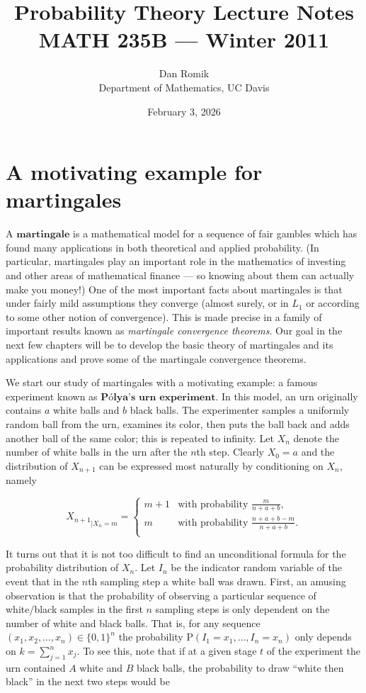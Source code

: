 \documentclass[11pt]{report}
\title{Probability Theory Lecture Notes \\ MATH 235B --- Winter 2011}
\author{Dan Romik \\ Department of Mathematics, UC Davis}
\date{February 3, 2026}
\theoremstyle{plain}
\theoremstyle{definition}
\begin{document}
\maketitle
{}
\tableofcontents

\chapter{A motivating example for martingales}
A $\textbf{martingale}$ is a mathematical model for a sequence of fair gambles which has found many applications in both theoretical and applied probability. (In particular, martingales play an important role in the mathematics of investing and other areas of mathematical finance --- so knowing about them can actually make you money!) One of the most important facts about martingales is that under fairly mild assumptions they converge (almost surely, or in $L_1$ or according to some other notion of convergence). This is made precise in a family of important results known as \emph{martingale convergence theorems}. Our goal in the next few chapters will be to develop the basic theory of martingales and its applications and prove some of the martingale convergence theorems.

We start our study of martingales with a motivating example: a famous experiment known as $\textbf{Pólya's urn experiment}$. In this model, an urn originally contains $a$ white balls and $b$ black balls. The experimenter samples a uniformly random ball from the urn, examines its color, then puts the ball back and adds another ball of the same color; this is repeated to infinity. Let $X_n$ denote the number of white balls in the urn after the $n$th step. Clearly $X_0 = a$ and the distribution of $X_{n+1}$ can be expressed most naturally by conditioning on $X_n$, namely

\begin{equation*} \tag{1}\label{eq:polya-conditional}
{X_{n+1}}_{\big| X_n = m} =
\begin{cases}
m+1 & \textrm{with probability }\frac{m}{n+a+b}, \\
m & \textrm{with probability }\frac{n+a+b-m}{n+a+b}. \\
\end{cases}
\end{equation*}

It turns out that it is not too difficult to find an unconditional formula for the probability distribution of $X_n$. Let $I_n$ be the indicator random variable of the event that in the $n$th sampling step a white ball was drawn. First, an amusing observation is that the probability of observing a particular sequence of white/black samples in the first $n$ sampling steps is only dependent on the number of white and black balls. That is, for any sequence $(x_1,x_2,\ldots,x_n)\in \{0,1\}^n$ the probability $\mathrm{P}(I_1 = x_1, \ldots, I_n = x_n)$ only depends on $k=\sum_{j=1}^n x_j$. To see this, note that if at a given stage $t$ of the experiment the urn contained $A$ white and $B$ black balls, the probability to draw ``white then black'' in the next two steps would be
\end{document}
